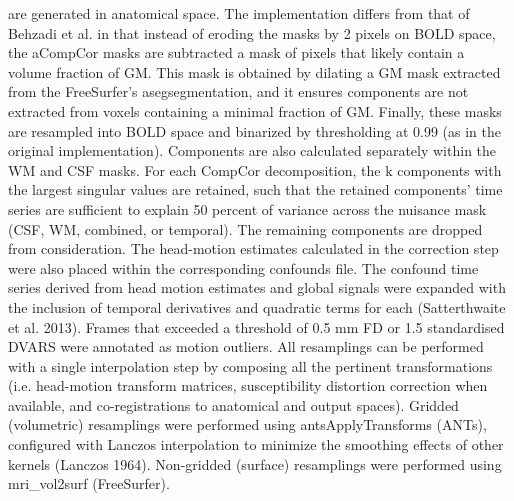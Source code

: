 are generated in anatomical space. The implementation differs from that of Behzadi et al. in that instead of eroding the masks by 2 pixels on BOLD space, the aCompCor masks are subtracted a mask of pixels that likely contain a volume fraction of GM. This mask is obtained by dilating a GM mask extracted from the FreeSurfer’s asegsegmentation, and it ensures components are not extracted from voxels containing a minimal fraction of GM. Finally, these masks are resampled into BOLD space and binarized by thresholding at 0.99 (as in the original implementation). Components are also calculated separately within the WM and CSF masks. For each CompCor decomposition, the k components with the largest singular values are retained, such that the retained components’ time series are sufficient to explain 50 percent of variance across the nuisance mask (CSF, WM, combined, or temporal). The remaining components are dropped from consideration. The head-motion estimates calculated in the correction step were also placed within the corresponding confounds file. The confound time series derived from head motion estimates and global signals were expanded with the inclusion of temporal derivatives and quadratic terms for each (Satterthwaite et al. 2013). Frames that exceeded a threshold of 0.5 mm FD or 1.5 standardised DVARS were annotated as motion outliers. All resamplings can be performed with a single interpolation step by composing all the pertinent transformations (i.e. head-motion transform matrices, susceptibility distortion correction when available, and co-registrations to anatomical and output spaces). Gridded (volumetric) resamplings were performed using antsApplyTransforms (ANTs), configured with Lanczos interpolation to minimize the smoothing effects of other kernels (Lanczos 1964). Non-gridded (surface) resamplings were performed using mri\_vol2surf (FreeSurfer).